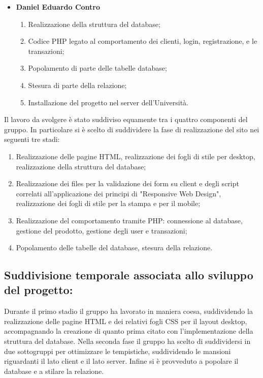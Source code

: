 \begin{itemize}
\begin{enumerate}
    \end{enumerate}
     \item \textbf{Daniel Eduardo Contro} \begin{enumerate}
        \item Realizzazione della struttura del database;
        \item Codice PHP legato al comportamento dei clienti, login, registrazione, e le transazioni;
        \item Popolamento di parte delle tabelle database;
        \item Stesura di parte della relazione;
        \item Installazione del progetto nel server dell'Università.
    \end{enumerate}
\end{itemize}

Il lavoro da svolgere è stato suddiviso equamente tra i quattro componenti del gruppo. In particolare si è scelto di suddividere la fase di realizzazione del sito nei seguenti tre stadi:
\begin{enumerate}
    \item Realizzazione delle pagine HTML, realizzazione dei fogli di stile per desktop, realizzazione della struttura del database;
    \item Realizzazione dei files per la validazione dei form su client e degli script correlati all'applicazione dei principi di "Responsive Web Design", realizzazione dei fogli di stile per la stampa e per il mobile;
    \item Realizzazione del comportamento tramite PHP: connessione al database, gestione del prodotto, gestione degli user e transazioni;
    \item Popolamento delle tabelle del database, stesura della relazione.
\end{enumerate}

\subsection{Suddivisione temporale associata allo sviluppo del progetto:}
Durante il primo stadio il gruppo ha lavorato in maniera coesa, suddividendo la realizzazione delle pagine HTML e dei relativi fogli CSS per il layout desktop, accompagnando la creazione di quanto prima citato con l'implementazione della struttura del database. Nella seconda fase il gruppo ha scelto di suddividersi in due sottogruppi per ottimizzare le tempistiche, suddividendo le mansioni riguardanti il lato client e il lato server. Infine si è provveduto a popolare il database e a stilare la relazione.